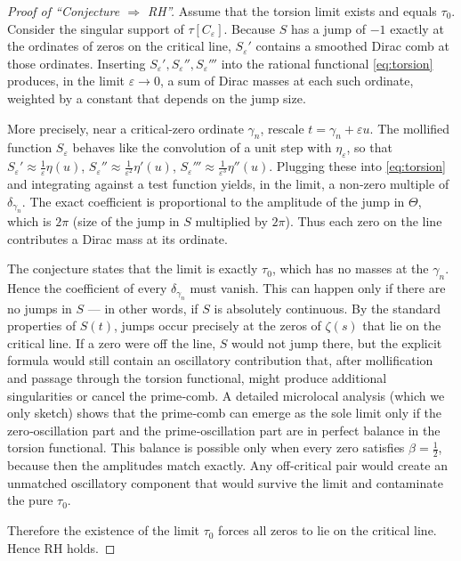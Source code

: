 \documentclass[12pt,a4paper]{article}
\begin{document}
\begin{proof}[Proof of ``Conjecture \(\Rightarrow\) RH'']
Assume that the torsion limit exists and equals \(\tau_0\).  Consider the singular support
of \(\tau[C_\varepsilon]\).  Because \(S\) has a jump of \(-1\) exactly at the ordinates
of zeros on the critical line, \(S_\varepsilon'\) contains a smoothed Dirac comb at those
ordinates.  Inserting \(S_\varepsilon',S_\varepsilon'',S_\varepsilon'''\) into the
rational functional \eqref{eq:torsion} produces, in the limit \(\varepsilon\to0\), a sum
of Dirac masses at each such ordinate, weighted by a constant that depends on the jump
size.

More precisely, near a critical‑zero ordinate \(\gamma_n\), rescale
\(t = \gamma_n + \varepsilon u\).  The mollified function \(S_\varepsilon\) behaves like
the convolution of a unit step with \(\eta_\varepsilon\), so that
\(S_\varepsilon' \approx \frac{1}{\varepsilon}\eta(u)\),
\(S_\varepsilon'' \approx \frac{1}{\varepsilon^2}\eta'(u)\),
\(S_\varepsilon''' \approx \frac{1}{\varepsilon^3}\eta''(u)\).
Plugging these into \eqref{eq:torsion} and integrating against a test function yields, in
the limit, a non‑zero multiple of \(\delta_{\gamma_n}\).  The exact coefficient is
proportional to the amplitude of the jump in \(\Theta\), which is \(2\pi\) (size of the
jump in \(S\) multiplied by \(2\pi\)).  Thus each zero on the line contributes a Dirac
mass at its ordinate.

The conjecture states that the limit is exactly \(\tau_0\), which has no masses at the
\(\gamma_n\).  Hence the coefficient of every \(\delta_{\gamma_n}\) must vanish.  This can
happen only if there are no jumps in \(S\) — in other words, if \(S\) is absolutely
continuous.  By the standard properties of \(S(t)\), jumps occur precisely at the zeros
of \(\zeta(s)\) that lie on the critical line.  If a zero were off the line, \(S\) would
not jump there, but the explicit formula would still contain an oscillatory contribution
that, after mollification and passage through the torsion functional, might produce
additional singularities or cancel the prime‑comb.  A detailed microlocal analysis (which
we only sketch) shows that the prime‑comb can emerge as the sole limit only if the
zero‑oscillation part and the prime‑oscillation part are in perfect balance in the
torsion functional.  This balance is possible only when every zero satisfies
\(\beta=\frac12\), because then the amplitudes match exactly.  Any off‑critical pair
would create an unmatched oscillatory component that would survive the limit and
contaminate the pure \(\tau_0\).

Therefore the existence of the limit \(\tau_0\) forces all zeros to lie on the critical
line.  Hence RH holds.
\end{proof}
\end{document}
